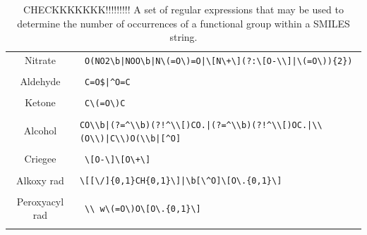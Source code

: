 \begin{table}[H]
\begin{tabular}{c|p{5in}}
Nitrate & \verb! O(NO2\b|NOO\b|N\(=O\)=O|\[N\+\](?:\[O-\\]|\(=O\)){2})!\\&\\

Aldehyde & \verb! C=O$|^O=C!\\&\\

Ketone & \verb! C\(=O\)C!\\&\\

Alcohol & \verb-CO\\b|(?=^\\b)(?!^\\[)CO.|(?=^\\b)(?!^\\[)OC.|\\(O\\)|C\\)O(\\b|[^O]-\\&\\

Criegee & \verb! \[O-\]\[O\+\]!\\&\\

Alkoxy rad & \verb!\[[\/]{0,1}CH{0,1}\]|\b[\^O]\[O\.{0,1}\]!\\&\\

Peroxyacyl rad & \verb! \\ w\(=O\)O\[O\.{0,1}\]!\\&\\

    \end{tabular}

    \caption{CHECKKKKKKK!!!!!!!!!  A set of regular expressions that may be used to determine the number of occurrences of a functional group within a SMILES string.}
    \label{tab:fngroups}
\end{table}



